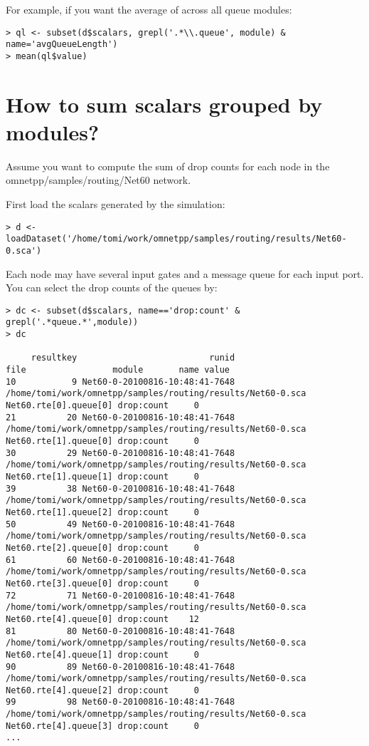 For example, if you want the average of  across all queue modules:

\begin{verbatim}
> ql <- subset(d$scalars, grepl('.*\\.queue', module) & name='avgQueueLength')
> mean(ql$value)
\end{verbatim}

\section{How to sum scalars grouped by modules?}

Assume you want to compute the sum of drop counts for each node in the
omnetpp/samples/routing/Net60 network.

First load the scalars generated by the simulation:

\begin{verbatim}
> d <- loadDataset('/home/tomi/work/omnetpp/samples/routing/results/Net60-0.sca')
\end{verbatim}

Each node may have several input gates and a message queue for each input port.
You can select the drop counts of the queues by:

\begin{verbatim}
> dc <- subset(d$scalars, name=='drop:count' & grepl('.*queue.*',module))
> dc

     resultkey                          runid                                                        file                 module       name value
10           9 Net60-0-20100816-10:48:41-7648 /home/tomi/work/omnetpp/samples/routing/results/Net60-0.sca  Net60.rte[0].queue[0] drop:count     0
21          20 Net60-0-20100816-10:48:41-7648 /home/tomi/work/omnetpp/samples/routing/results/Net60-0.sca  Net60.rte[1].queue[0] drop:count     0
30          29 Net60-0-20100816-10:48:41-7648 /home/tomi/work/omnetpp/samples/routing/results/Net60-0.sca  Net60.rte[1].queue[1] drop:count     0
39          38 Net60-0-20100816-10:48:41-7648 /home/tomi/work/omnetpp/samples/routing/results/Net60-0.sca  Net60.rte[1].queue[2] drop:count     0
50          49 Net60-0-20100816-10:48:41-7648 /home/tomi/work/omnetpp/samples/routing/results/Net60-0.sca  Net60.rte[2].queue[0] drop:count     0
61          60 Net60-0-20100816-10:48:41-7648 /home/tomi/work/omnetpp/samples/routing/results/Net60-0.sca  Net60.rte[3].queue[0] drop:count     0
72          71 Net60-0-20100816-10:48:41-7648 /home/tomi/work/omnetpp/samples/routing/results/Net60-0.sca  Net60.rte[4].queue[0] drop:count    12
81          80 Net60-0-20100816-10:48:41-7648 /home/tomi/work/omnetpp/samples/routing/results/Net60-0.sca  Net60.rte[4].queue[1] drop:count     0
90          89 Net60-0-20100816-10:48:41-7648 /home/tomi/work/omnetpp/samples/routing/results/Net60-0.sca  Net60.rte[4].queue[2] drop:count     0
99          98 Net60-0-20100816-10:48:41-7648 /home/tomi/work/omnetpp/samples/routing/results/Net60-0.sca  Net60.rte[4].queue[3] drop:count     0
...
\end{verbatim}

